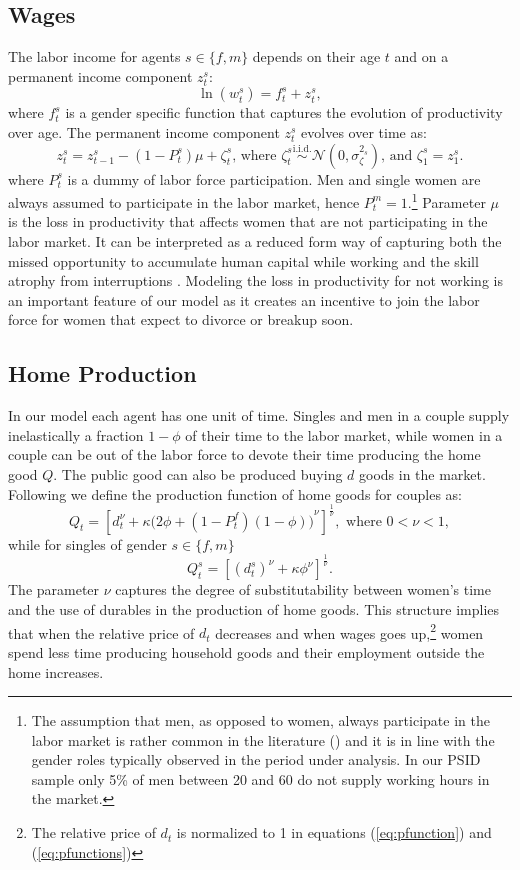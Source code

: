 \documentclass[12pt]{article}
\numberwithin{table}{section}
\begin{document}
\subsection{Wages}
The labor income for agents $s\in\{f,m\}$ depends on their age $t$ and on a permanent income component $z^s_t$:
\[\ln(w^s_t)=f^s_t+z^s_t,\]
where $f^s_t$ is a gender specific function that captures the evolution of productivity over age. The permanent income component  $z^s_t$ evolves over time as:
\begin{equation}\label{eq:pcomp}
z^s_t=z^s_{t-1}-(1-P_t^s) \mu+\zeta^s_{t}\text{, where }\zeta^s_{t}\overset{\text{i.i.d.}}{\sim}\mathcal{N}(0,\sigma_\zeta^{2_s})\text{, and }\zeta^s_{1}=z^s_{1}.
\end{equation}
where $P^s_t$ is a dummy of labor force participation. Men and single women are always assumed to participate in the labor market, hence $P^m_t=1$.\footnote{The assumption that men, as opposed to women, always participate in the labor market is rather common in the literature (\citealp{ciscato2019,low2018,voena2015}) and it is in line with the gender roles typically observed in the period under analysis. In our PSID sample only 5\% of men between 20 and 60 do not supply working hours in the market.} Parameter $\mu$ is the loss in productivity that affects women that are not participating in the labor market. It can be interpreted as a reduced form way of capturing both the missed opportunity to accumulate human capital while working and the skill atrophy from interruptions \citep{adda2017}. Modeling the loss in productivity for not working is an important feature of our model as it creates an incentive to join the labor force for women that expect to divorce or breakup soon. 
\subsection{Home Production}
In our model each agent has one unit of time. Singles and men in a couple supply inelastically a fraction $1-\phi$ of their time to the labor market, while women in a couple can be out of the labor force to devote their time producing the home good $Q$. The public good can also be produced buying $d$ goods in the market. Following \cite{greenwood2016} we define the production function of home goods for couples as:
\begin{equation}\label{eq:pfunction}
Q_t=[d_t^\nu+\kappa ({2\phi+(1-P^f_t)(1-\phi))}^\nu]^{\frac{1}{\nu}}, \text{ where }0<\nu<1,
\end{equation}
while for singles of gender $s\in\{f,m\}$
\begin{equation}\label{eq:pfunctions}
Q^s_t=[(d^s_t)^\nu+\kappa \phi^\nu]^{\frac{1}{\nu}}.
\end{equation}
The parameter $\nu$ captures the degree of substitutability between women's time and the use of durables in the production of home goods. This structure implies that when the relative price of $d_t$ decreases and when wages goes up,\footnote{The relative price of $d_t$ is normalized to 1 in equations (\ref{eq:pfunction}) and (\ref{eq:pfunctions})} women spend less time producing household goods and their employment outside the home increases.
\end{document}
